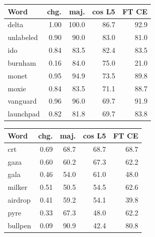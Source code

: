 \begin{minipage}[t]{0.49\linewidth}\centering
\begin{tabular}{@{}lrrrr@{}}
\toprule
Word & chg. & maj. & cos L5 & FT CE \\
\midrule
delta & 1.00 & 100.0 & 86.7 & 92.9 \\
unlabeled & 0.90 & 90.0 & 83.0 & 81.0 \\
ido & 0.84 & 83.5 & 82.4 & 83.5 \\
burnham & 0.16 & 84.0 & 75.0 & 21.0 \\
monet & 0.95 & 94.9 & 73.5 & 89.8 \\
moxie & 0.84 & 83.5 & 71.1 & 88.7 \\
vanguard & 0.96 & 96.0 & 69.7 & 91.9 \\
launchpad & 0.82 & 81.8 & 69.7 & 83.8 \\
\bottomrule
\end{tabular}
\end{minipage}\hfill
\begin{minipage}[t]{0.49\linewidth}\centering
\begin{tabular}{@{}lrrrr@{}}
\toprule
Word & chg. & maj. & cos L5 & FT CE \\
\midrule
crt & 0.69 & 68.7 & 68.7 & 68.7 \\
gaza & 0.60 & 60.2 & 67.3 & 62.2 \\
gala & 0.46 & 54.0 & 61.0 & 48.0 \\
milker & 0.51 & 50.5 & 54.5 & 62.6 \\
airdrop & 0.41 & 59.2 & 54.1 & 39.8 \\
pyre & 0.33 & 67.3 & 48.0 & 62.2 \\
bullpen & 0.09 & 90.9 & 42.4 & 80.8 \\
\bottomrule
\end{tabular}
\end{minipage}